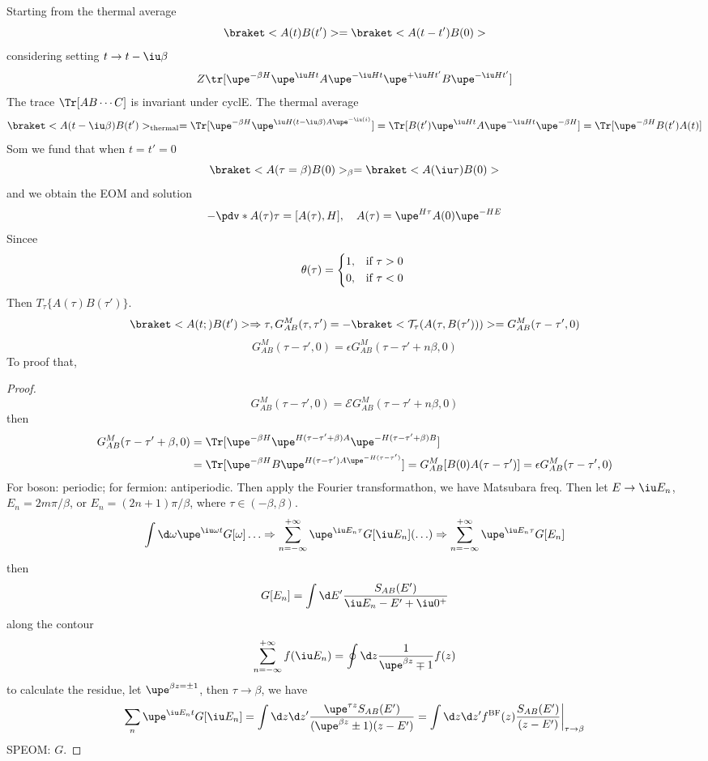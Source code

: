 Starting from the thermal average
\begin{equation}
  \braket<A(t)B(t')> = \braket<A(t - t')B(0)>
\end{equation}
considering setting $t \to t - \iu\beta$
\[
  Z \tr[\upe^{-\beta H} \upe^{\iu Ht} A \upe^{-\iu Ht} \upe^{+\iu Ht'}B\upe^{-\iu Ht'}]
\]
The trace $\Tr[AB\cdots C]$ is invariant under cyclE. The thermal average
\begin{equation}
     \braket<A(t-\iu\beta)B(t')>_\text{thermal}
  = \Tr[\upe^{-\beta H} \upe^{\iu H(t-\iu\beta)A\upe^{-\iu(i)}}]
  = \Tr[B(t') \upe^{\iu Ht} A \upe^{-\iu Ht} \upe^{-\beta H}]
  = \Tr[\upe^{-\beta H} B(t') A(t)]
\end{equation}
Som we fund that when $t = t' = 0$
\[
  \braket<A(\tau=\beta)B(0)>_\beta = \braket<A(\iu\tau)B(0)>
\]
and we obtain the EOM and solution
\[
  -\pdv*{A(\tau)}\tau = [A(\tau), H], \quad A(\tau) = \upe^{H\tau} A(0) \upe^{-HE}
\]
Sincee
\[
  \theta(\tau) = \begin{cases*}
    1, & if $\tau > 0$\\
    0, & if $\tau < 0$
  \end{cases*}
\]
Then $T_\tau\{A(\tau) B(\tau')\}$.
\[
  \braket<A(t;)B(t')> \Rightarrow \tau,
  G_{AB}^M (\tau,\tau') = -\braket<\mathcal T_\tau(A(\tau, B(\tau')))> = G_{AB}^M (\tau-\tau',0)
\]
\[
  G_{AB}^M (\tau-\tau',0) = \epsilon G_{AB}^M(\tau - \tau' + n\beta, 0)
\]
To proof that,
\begin{proof}
  \begin{equation}
    G_{AB}^M (\tau-\tau',0) = \mathcal EG_{AB}^M(\tau-\tau' + n\beta,0)
  \end{equation}
  then
  \begin{align*}
    G_{AB}^M (\tau-\tau' + \beta,0) &
  = \Tr[\upe^{-\beta H} \upe^{H(\tau-\tau'+\beta)A}
        \upe^{-H(\tau-\tau'+\beta) B}]\\
  & = \Tr[\upe^{-\beta H} B \upe^{H(\tau-\tau') A \upe^{-H(\tau-\tau')}}]
  = G_{AB}^M [B(0) A(\tau-\tau')] = \epsilon G_{AB}^M (\tau-\tau',0)
  \end{align*}
  For boson: periodic; for fermion: antiperiodic.
  Then apply the Fourier transformathon, we have Matsubara freq.
  Then let $E \to \iu E_n$, $E_n = 2m\pi/\beta$, or $E_n = (2n + 1)\pi/\beta$,
  where $\tau\in(-\beta,\beta)$.
  \[
    \int \d\omega \upe^{\iu\omega t} G[\omega] \ldots \Rightarrow
    \sum_{n=-\infty}^{+\infty} \upe^{\iu E_n\tau} G[\iu E_n] (\ldots)
    \Rightarrow \sum_{n=-\infty}^{+\infty} \upe^{\iu E_n\tau} G[E_n]
  \]
  then
  \begin{equation}
    G[E_n] = \int \d E' \frac{S_{AB}(E')}{\iu E_n - E' + \iu0^+}
  \end{equation}
  along the contour
  \[
    \sum_{n=-\infty}^{+\infty} f(\iu E_n) = \oint \d z \frac{1}{\upe^{\beta z}\mp 1} f(z)
  \]
  to calculate the residue, let $\upe^{\beta z = \pm 1}$, then $\tau\to\beta$, we have
  \begin{equation}
    \sum_n \upe^{\iu E_nt} G[\iu E_n]
  = \int \d z \d z' \frac{\upe^{\tau z} S_{AB}(E')}{(\upe^{\beta z} \pm 1) (z - E')}
  = \int \d z \d z' f^\text{BF}(z) \frac{S_{AB}(E')}{(z - E')}\bigg|_{\tau\to\beta}
  \end{equation}
  SPEOM: $G$.
\end{proof}

